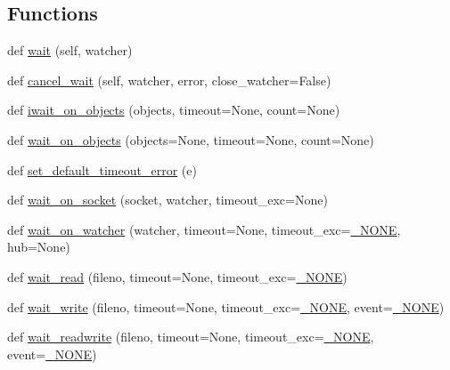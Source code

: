 \subsection*{Functions}
\begin{DoxyCompactItemize}
\item 
def \hyperlink{namespacegevent_1_1__hub__primitives_aca76d6a00bb3e30192d61faa90f10e9d}{wait} (self, watcher)
\item 
def \hyperlink{namespacegevent_1_1__hub__primitives_a770d622e477cf73f6b30dd05850ade67}{cancel\+\_\+wait} (self, watcher, error, close\+\_\+watcher=False)
\item 
def \hyperlink{namespacegevent_1_1__hub__primitives_ae5fd0efa38447d7a7a15f9218ae50c19}{iwait\+\_\+on\+\_\+objects} (objects, timeout=None, count=None)
\item 
def \hyperlink{namespacegevent_1_1__hub__primitives_a670618f9da100eaaa5d2a7b80b746926}{wait\+\_\+on\+\_\+objects} (objects=None, timeout=None, count=None)
\item 
def \hyperlink{namespacegevent_1_1__hub__primitives_ae92cc5ba65b855482653a2f9592ee847}{set\+\_\+default\+\_\+timeout\+\_\+error} (e)
\item 
def \hyperlink{namespacegevent_1_1__hub__primitives_a25ceb34f03f1cfac42467e304aed6fd2}{wait\+\_\+on\+\_\+socket} (socket, watcher, timeout\+\_\+exc=None)
\item 
def \hyperlink{namespacegevent_1_1__hub__primitives_ae484b73e4c293e8788d5857165c2e230}{wait\+\_\+on\+\_\+watcher} (watcher, timeout=None, timeout\+\_\+exc=\hyperlink{classgevent_1_1__util_1_1___n_o_n_e}{\+\_\+\+N\+O\+NE}, hub=None)
\item 
def \hyperlink{namespacegevent_1_1__hub__primitives_a50d1746d1e26dabc9e0b9eb1f3a226d3}{wait\+\_\+read} (fileno, timeout=None, timeout\+\_\+exc=\hyperlink{classgevent_1_1__util_1_1___n_o_n_e}{\+\_\+\+N\+O\+NE})
\item 
def \hyperlink{namespacegevent_1_1__hub__primitives_ad85018e5bc9d1b852a8d111fa5ad1b6f}{wait\+\_\+write} (fileno, timeout=None, timeout\+\_\+exc=\hyperlink{classgevent_1_1__util_1_1___n_o_n_e}{\+\_\+\+N\+O\+NE}, event=\hyperlink{classgevent_1_1__util_1_1___n_o_n_e}{\+\_\+\+N\+O\+NE})
\item 
def \hyperlink{namespacegevent_1_1__hub__primitives_af51473b17ea50f4388118cb6ba839a1e}{wait\+\_\+readwrite} (fileno, timeout=None, timeout\+\_\+exc=\hyperlink{classgevent_1_1__util_1_1___n_o_n_e}{\+\_\+\+N\+O\+NE}, event=\hyperlink{classgevent_1_1__util_1_1___n_o_n_e}{\+\_\+\+N\+O\+NE})
\end{DoxyCompactItemize}


